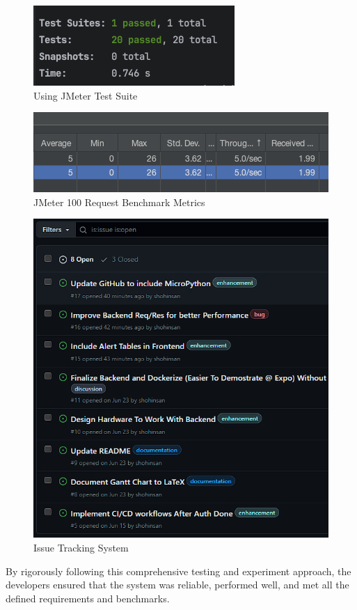 \begin{figure}[htbp]
    \centering
    \includegraphics[width=1\linewidth]{images/Jest-Test-Suite.png}
    \caption{Using JMeter Test Suite}
    \label{fig:figure2}

\end{figure}

\begin{figure}[htbp]
    \centering
    \includegraphics[width=1\linewidth]{images/JMeter_100reqBenchmark.png}
    \caption{JMeter 100 Request Benchmark Metrics}
    \label{fig:figure3}
\end{figure}

\begin{figure}[htbp]
    \centering
    \includegraphics[width=1\linewidth]{images/GitHubIssues.png}
    \caption{Issue Tracking System}
    \label{fig:gitIssues}
\end{figure}

By rigorously following this comprehensive testing and experiment
approach, the developers ensured that the system was reliable,
performed well, and met all the defined requirements and benchmarks. %